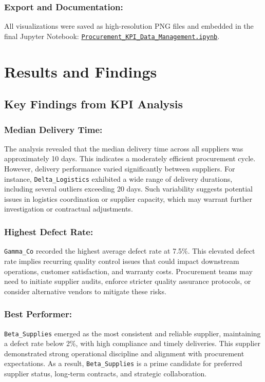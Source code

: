 \documentclass[10pt, twocolumn]{article}
\begin{document}
\subsubsection{Export and Documentation:} All visualizations were saved as high-resolution PNG files and embedded in the final Jupyter Notebook: \href{https://drive.google.com/file/d/12n0YHynQiv8DrsjJufy-sEqBVPAvPabL/view?usp=sharing}{\texttt{Procurement\_KPI\_Data\_Management.ipynb}}.

 
\section{Results and Findings}

\subsection{Key Findings from KPI Analysis}

\subsubsection{Median Delivery Time:} The analysis revealed that the median delivery time across all suppliers was approximately 10 days. This indicates a moderately efficient procurement cycle. However, delivery performance varied significantly between suppliers. For instance, \texttt{Delta\_Logistics} exhibited a wide range of delivery durations, including several outliers exceeding 20 days. Such variability suggests potential issues in logistics coordination or supplier capacity, which may warrant further investigation or contractual adjustments.

\subsubsection{Highest Defect Rate:} \texttt{Gamma\_Co} recorded the highest average defect rate at 7.5\%. This elevated defect rate implies recurring quality control issues that could impact downstream operations, customer satisfaction, and warranty costs. Procurement teams may need to initiate supplier audits, enforce stricter quality assurance protocols, or consider alternative vendors to mitigate these risks.

\subsubsection{Best Performer:} \texttt{Beta\_Supplies} emerged as the most consistent and reliable supplier, maintaining a defect rate below 2\%, with high compliance and timely deliveries. This supplier demonstrated strong operational discipline and alignment with procurement expectations. As a result, \texttt{Beta\_Supplies} is a prime candidate for preferred supplier status, long-term contracts, and strategic collaboration.
\end{document}
